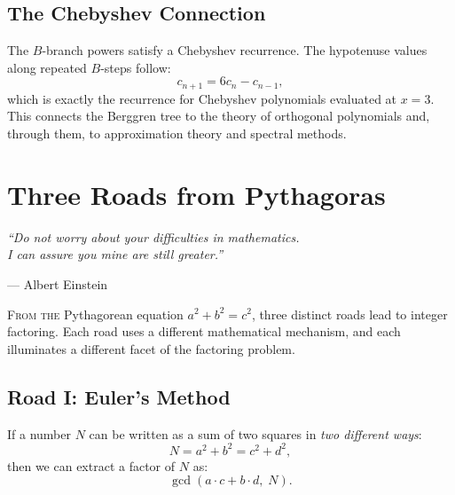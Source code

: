 \documentclass[11pt,twoside,openright]{book}
\theoremstyle{definition}
\begin{document}
\section{The Chebyshev Connection}

The $B$-branch powers satisfy a Chebyshev recurrence. The hypotenuse
values along repeated $B$-steps follow:
\[
c_{n+1} = 6c_n - c_{n-1},
\]
which is exactly the recurrence for Chebyshev polynomials evaluated at $x=3$.
This connects the Berggren tree to the theory of orthogonal polynomials
and, through them, to approximation theory and spectral methods.

\chapter{Three Roads from Pythagoras}
\label{ch:three-roads}

\epigraph{\itshape ``Do not worry about your difficulties in mathematics.\\
I can assure you mine are still greater.''}
{--- Albert Einstein}

\lettrine[lines=3]{F}{rom the} Pythagorean equation $a^2+b^2=c^2$, three
distinct roads lead to integer factoring. Each road uses a different
mathematical mechanism, and each illuminates a different facet of the
factoring problem.

\section{Road I: Euler's Method}

If a number $N$ can be written as a sum of two squares in \emph{two different ways}:
\[
N = a^2 + b^2 = c^2 + d^2,
\]
then we can extract a factor of $N$ as:
\[
\gcd(a \cdot c + b \cdot d,\; N).
\]

\begin{center}
\end{center}
\end{document}
